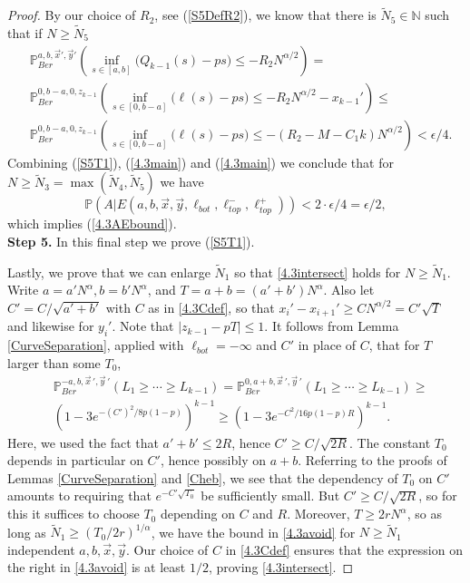 \begin{proof}
	By our choice of $R_2$, see (\ref{S5DefR2}), we know that there is $\tilde{N}_5 \in \mathbb{N}$ such that if $N \geq \tilde{N}_5$
	\begin{equation}\label{4.3main2}
		\begin{split}
			&\mathbb{P}^{a, b, \vec{x}', \vec{y}'}_{Ber} \left( \inf_{s\in[a,b]} \big(Q_{k-1}(s) - ps\big) \leq -R_2 N^{\alpha/2} \right) = \\
			&\mathbb{P}^{0, b-a, 0, z_{k-1}}_{Ber} \left( \inf_{s\in[0,b-a]} \big(\ell(s) - ps\big) \leq -R_2 N^{\alpha/2} - x_{k-1}'\right) \leq \\
			&\mathbb{P}^{0, b-a, 0, z_{k-1}}_{Ber} \left( \inf_{s\in[0,b-a]} \big(\ell(s) - ps\big) \leq -(R_2 - M - C_1k) N^{\alpha/2} \right) < \epsilon/4.
		\end{split}
	\end{equation}
	Combining (\ref{S5T1}), (\ref{4.3main}) and (\ref{4.3main}) we conclude that for $N \geq \tilde{N}_3 = \max(\tilde{N}_4, \tilde{N}_5)$ we have
	$$\mathbb{P}(A|E(a,b,\vec{x},\vec{y},\ell_{bot},\ell_{top}^-, \ell_{top}^+)) < 2 \cdot \epsilon/4 = \epsilon/2,$$
	which implies (\ref{4.3AEbound}).\\
	
	\noindent\textbf{Step 5.} In this final step we prove (\ref{S5T1}).
	
	Lastly, we prove that we can enlarge $\tilde{N}_1$ so that \eqref{4.3intersect} holds for $N\geq\tilde{N}_1$. Write $a = a'N^\alpha, b = b'N^\alpha$, and $T = a+b = (a'+b')N^\alpha$. Also let $C' = C/\sqrt{a'+b'}$ with $C$ as in \eqref{4.3Cdef}, so that $x_i' - x_{i+1}' \geq CN^{\alpha/2} = C'\sqrt{T}$ and likewise for $y_i'$. Note that $|z_{k-1}-pT| \leq 1$. It follows from Lemma \ref{CurveSeparation}, applied with $\ell_{bot} = -\infty$ and $C'$ in place of $C$, that for $T$ larger than some $T_0$, 
	\begin{equation}\label{4.3avoid}
		\begin{split}
			& \mathbb{P}^{-a, b, \vec{x}\,', \vec{y}\,'}_{Ber}(L_1 \geq \cdots \geq L_{k-1}) = \mathbb{P}^{0, a+b, \vec{x}\,', \vec{y}\,'}_{Ber}(L_1 \geq \cdots \geq L_{k-1}) \geq\\ & \left(1 - 3e^{-(C')^2/8p(1-p)}\right)^{k-1} \geq \left(1 - 3e^{-C^2/16p(1-p)R}\right)^{k-1}.
		\end{split}
	\end{equation}
	Here, we used the fact that $a'+b' \leq 2R$, hence $C' \geq C/\sqrt{2R}$. The constant $T_0$ depends in particular on $C'$, hence possibly on $a+b$. Referring to the proofs of Lemmas \ref{CurveSeparation} and \ref{Cheb}, we see that the dependency of $T_0$ on $C'$ amounts to requiring that $e^{-C'\sqrt{T_0}}$ be sufficiently small. But $C' \geq C/\sqrt{2R}$, so for this it suffices to choose $T_0$ depending on $C$ and $R$. Moreover, $T\geq 2rN^\alpha$, so as long as $\tilde{N}_1 \geq (T_0/2r)^{1/\alpha}$, we have the bound in \eqref{4.3avoid} for $N\geq\tilde{N}_1$ independent $a,b,\vec{x},\vec{y}$. Our choice of $C$ in \eqref{4.3Cdef} ensures that the expression on the right in \eqref{4.3avoid} is at least $1/2$, proving \eqref{4.3intersect}.
	

\end{proof}
